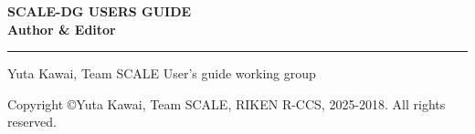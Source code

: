 \newpage
\thispagestyle{empty}

\vspace{10mm}
{\large{\bf SCALE-DG USERS GUIDE}}\\


\vspace{10mm}
{\large{\bf Author \& Editor}}\\
\hrule width 90mm
\begin{tabbing}
Yuta Kawai, Team SCALE User's guide working group\\
\end{tabbing}


\vspace{110mm}
\begin{flushright}
\noindent {\small {\rm
\ovalbox{
}}}

\vspace{10mm}
Copyright \copyright Yuta Kawai, Team SCALE, RIKEN R-CCS, 2025-2018. All rights reserved.
\end{flushright}

